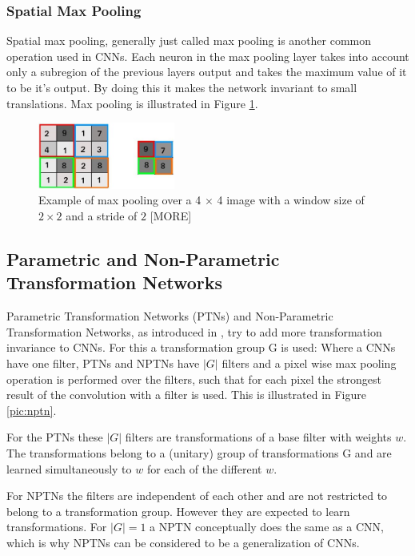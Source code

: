 \documentclass{llncs}
\begin{document}
\subsubsection{Spatial Max Pooling}
Spatial max pooling, generally just called max pooling is another common operation used in CNNs.
Each neuron in the max pooling layer takes into account only a subregion of the previous
layers output and takes the maximum value of it to be it's output. By doing this it makes the network invariant to small translations. Max pooling is illustrated in Figure \ref{fig:maxpooling}.

\begin{figure}
	\begin{center}
		\includegraphics[width=0.40\textwidth]{result_images/maxpooling.jpg}
		\caption{Example of max pooling over a 4 $\times$ 4 image with a window size of $2 \times 2$ and a stride of $2$ [MORE]}
		\label{fig:maxpooling}
	\end{center}
\end{figure}

\subsection{Parametric and Non-Parametric Transformation Networks}

Parametric Transformation Networks (PTNs) and Non-Parametric Transformation Networks, as introduced in \cite{NPTN}, try to add more transformation invariance to CNNs. For this a transformation group G is used:
Where a CNNs have one filter, PTNs and NPTNs have $|G|$ filters and a pixel wise max pooling operation is performed over the filters, such that for each pixel the strongest result of the convolution with a filter is used. This is illustrated in Figure \ref{pic:nptn}.

For the PTNs these $|G|$ filters are transformations of a base filter with weights $w$. The transformations belong to a (unitary) group of transformations G and are learned simultaneously to $w$ for each of the different $w$. 

For NPTNs the filters are independent of each other and are not restricted to belong to a transformation group. However they are expected to learn transformations.
For $|G|=1$ a NPTN conceptually does the same as a CNN, which is why NPTNs can be considered to be a generalization of CNNs. 
\end{document}
